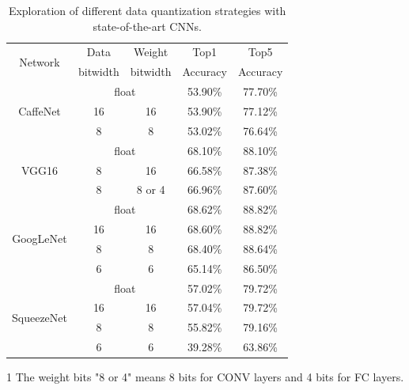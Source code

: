 \documentclass[10pt, conference, compsocconf]{IEEEtran}
\begin{document}
\begin{table}[ht]
\centering
    \begin{threeparttable}
        \caption{Exploration of different data quantization strategies with state-of-the-art CNNs.}
        \label{tab:quantization}
        \begin{tabular}{|c|c|c|c|c|}
        \hline
        \multirow{2}[2]{*}{Network} & Data  & Weight & Top1  & Top5 \\
              & bitwidth & bitwidth & Accuracy & Accuracy \\
        \hline
        \multirow{3}[6]{*}{CaffeNet} & \multicolumn{2}{c|}{float} & 53.90\% & 77.70\% \\
    \cline{2-5}          & 16    & 16    & 53.90\% & 77.12\% \\
    \cline{2-5}          & 8     & 8     & 53.02\% & 76.64\% \\
        \hline
        \multirow{3}[6]{*}{VGG16} & \multicolumn{2}{c|}{float} & 68.10\% & 88.10\% \\
    \cline{2-5}          & 8     & 16    & 66.58\% & 87.38\% \\
    \cline{2-5}          & 8     & 8 or 4 & 66.96\% & 87.60\% \\
        \hline
        \multirow{4}[8]{*}{GoogLeNet} & \multicolumn{2}{c|}{float} & 68.62\% & 88.82\% \\
    \cline{2-5}          & 16    & 16    & 68.60\% & 88.82\% \\
    \cline{2-5}          & 8     & 8     & 68.40\% & 88.64\% \\
    \cline{2-5}          & 6     & 6     & 65.14\% & 86.50\% \\
        \hline
        \multirow{4}[8]{*}{SqueezeNet} & \multicolumn{2}{c|}{float} & 57.02\% & 79.72\% \\
    \cline{2-5}          & 16    & 16    & 57.04\% & 79.72\% \\
    \cline{2-5}          & 8     & 8     & 55.82\% & 79.16\% \\
    \cline{2-5}          & 6     & 6     & 39.28\% & 63.86\% \\
        \hline
        \end{tabular}

        \begin{tablenotes}
            \item[1] The weight bits "8 or 4" means 8 bits for CONV layers and 4 bits for FC layers.
        \end{tablenotes}
    \end{threeparttable}
\end{table}
\end{document}

